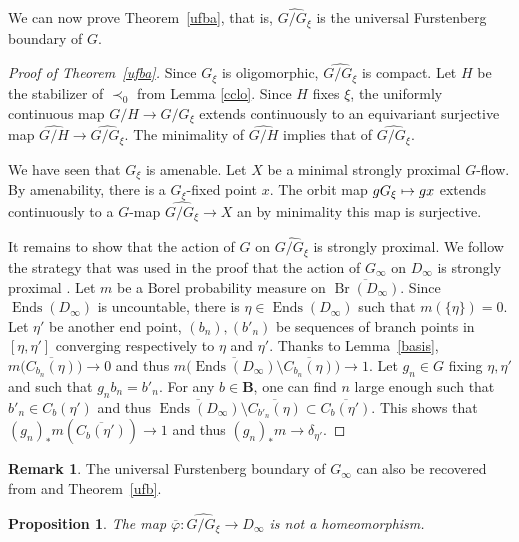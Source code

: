 \documentclass[JEP,XML,SOM,Unicode,NoFloatCountersInSection]{cedram}
\newcommand\mto{\mathchoice{\longmapsto}{\mapsto}{\mapsto}{\mapsto}}
\theoremstyle{plain}
\newtheorem{prop}[thm]{Proposition}
\theoremstyle{definition}
\newtheorem{rem}[thm]{Remark}
\newcommand{\bB}{{\boldsymbol{B}}}
\DeclareMathOperator{\Ends}{Ends}
\DeclareMathOperator{\Br}{Br}
\begin{document}
We can now prove Theorem~\ref{ufba}, that is, $\widehat{G/G_\xi}$ is the universal Furstenberg boundary of $G$.
\begin{proof}[Proof of Theorem~\ref{ufba}]

Since $G_\xi$ is oligomorphic, $\widehat{G/G_\xi}$ is compact. Let $H$ be the stabilizer of $\prec_0$ from Lemma \ref{cclo}. Since $H$ fixes $\xi$, the uniformly continuous map $G/H\to G/G_\xi$ extends continuously to an equivariant surjective map $\widehat{G/H}\to\widehat{G/G_\xi}$. The minimality of $\widehat{G/H}$ implies that of $\widehat{G/G_\xi}$.

We have seen that $G_\xi$ is amenable. Let $X$ be a minimal strongly proximal $G$\nobreakdash-flow. By amenability, there is a $G_\xi$-fixed point $x$. The orbit map $gG_\xi\mto gx$ extends continuously to a $G$-map $\widehat{G/G_\xi}\to X$ an by minimality this map is surjective.

It remains to show that the action of $G$ on $\widehat{G/G_\xi}$ is strongly proximal. We follow the strategy that was used in the proof that the action of $G_\infty$ on $D_\infty$ is strongly proximal \cite[Th.\,10.1]{DM_dendrites}.
Let $m$ be a Borel probability measure on $\overline{\Br(D_\infty)}$. Since $\Ends(D_\infty)$ is uncountable, there is $\eta\in\Ends(D_\infty)$ such that $m(\{\eta\})=0$. Let $\eta'$ be another end point, $(b_n), (b'_n)$ be sequences of branch points in $[\eta,\eta']$ converging respectively to $\eta$ and $\eta'$. Thanks to Lemma~\ref{basis}, $m\bigl(\overline{C_{b_n}(\eta)}\bigr)\to 0$ and thus $m\bigl(\overline{\Ends(D_\infty)}\setminus\overline{C_{b_n}(\eta)}\bigr)\to 1$. Let $g_n\in G$ fixing $\eta,\eta'$ and such that $g_nb_n=b'_n$. For any $b\in\bB$, one can find $n$ large enough such that $b'_n\in C_b(\eta')$ and thus $\overline{\Ends(D_\infty)}\setminus\overline{C_{b'_n}(\eta)}\subset \overline{C_b(\eta')}$. This shows that $(g_n)_\ast m(\overline{C_b(\eta')})\to 1$ and thus $(g_n)_\ast m\to \delta_{\eta'}$.
\end{proof}

\begin{rem}
The universal Furstenberg boundary of $G_\infty$ can also be recovered from 	\cite[Th.\,7.5]{2018arXiv181200392Z} and Theorem~\ref{ufb}.\end{rem}

\begin{prop}\label{nothomeo} The map $\overline{\varphi}\colon\widehat{G/G_\xi}\to D_\infty$ is not a homeomorphism.\end{prop}
\end{document}
